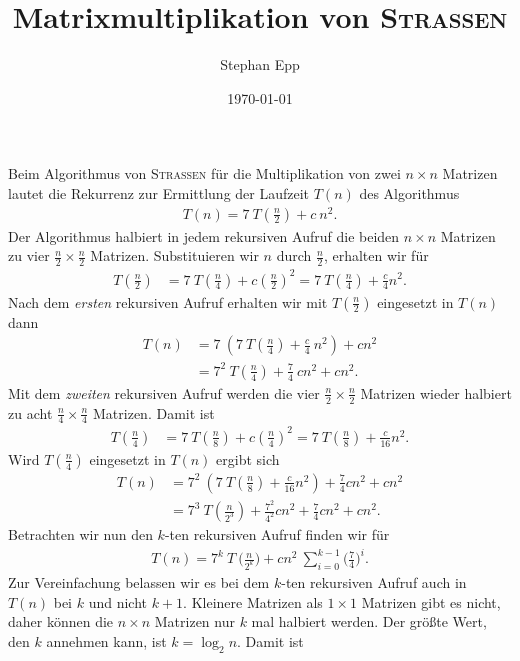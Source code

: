 \documentclass{scrartcl}
\title{Matrixmultiplikation von \normalfont\scshape{Strassen}}
\author{Stephan Epp}
\date{\today}
\begin{document}
\maketitle
Beim Algorithmus von \textsc{Strassen} für die Multiplikation von zwei $n \times n$ Matrizen lautet die Rekurrenz zur Ermittlung der Laufzeit $T(n)$ des Algorithmus
\begin{align*}
	T(n) = 7 \: T(\tfrac{n}{2}) + c\: n^2.
\end{align*}
Der Algorithmus halbiert in jedem rekursiven Aufruf die beiden $n \times n$ Matrizen zu vier $\tfrac{n}{2} \times \tfrac{n}{2}$ Matrizen. Substituieren wir $n$ durch $\tfrac{n}{2}$, erhalten wir für
\begin{align*}
	T(\tfrac{n}{2}) &= 7 \: T(\tfrac{n}{4}) + c(\tfrac{n}{2})^2 = 7 \: T(\tfrac{n}{4}) + \tfrac{c}{4}n^2.
\end{align*}
Nach dem \textit{ersten} rekursiven Aufruf erhalten wir mit $T(\frac{n}{2})$ eingesetzt in $T(n)$ dann
\begin{align*}
	T(n) &= 7 \: (7 \: T(\tfrac{n}{4}) + \tfrac{c}{4} \: n^2) + c n^2 \\
	&= 7^2\: T(\tfrac{n}{4}) + \tfrac{7}{4} \: cn^2 + c n^2.
\end{align*}
Mit dem \textit{zweiten} rekursiven Aufruf werden die vier $\tfrac{n}{2} \times \tfrac{n}{2}$ Matrizen wieder halbiert zu acht $\tfrac{n}{4} \times \tfrac{n}{4}$ Matrizen. Damit ist
\begin{align*}
	T(\tfrac{n}{4}) &= 7 \: T(\tfrac{n}{8}) + c(\tfrac{n}{4})^2 = 7 \: T(\tfrac{n}{8}) + \tfrac{c}{16}n^2.
\end{align*}
Wird $T(\tfrac{n}{4})$ eingesetzt in $T(n)$ ergibt sich
\begin{align*}
	T(n) &= 7^2\: (7 \: T(\tfrac{n}{8}) + \tfrac{c}{16}n^2) + \tfrac{7}{4}cn^2 + c n^2 \\
	&= 7^3\: T(\tfrac{n}{2^3}) + \tfrac{7^2}{4^2}cn^2 + \tfrac{7}{4}cn^2 + c n^2.
\end{align*}
Betrachten wir nun den $k$-ten rekursiven Aufruf finden wir für 
\begin{align*}
	T(n) = 7^k \: T \: \big(\tfrac{n}{2^k}\big) + cn^2 \: \sum_{i = 0}^{k-1} \bigg(\frac{7}{4}\bigg)^i.
\end{align*}
Zur Vereinfachung belassen wir es bei dem $k$-ten rekursiven Aufruf auch in $T(n)$ bei $k$ und nicht $k + 1$. Kleinere Matrizen als $1 \times 1$ Matrizen gibt es nicht, daher können die $n \times n$ Matrizen nur $k$ mal halbiert werden. Der größte Wert, den $k$ annehmen kann, ist $k = \log_{2}n$. Damit ist
\end{document}
